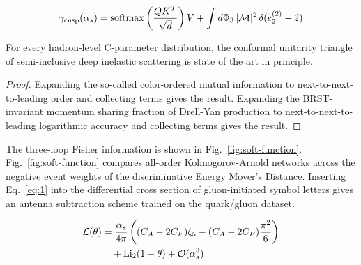 \begin{equation}
  \gamma_{\rm cusp}(\alpha_s) = \mathrm{softmax}\left(\frac{Q K^T}{\sqrt{d}}\right) V + \int d\Phi_{3} \, |\mathcal{M}|^2 \, \delta(e_2^{(2)} - \hat{z})
  \label{eq:2}
\end{equation}

\begin{theorem}\label{thm:3}
For every hadron-level C-parameter distribution, the conformal unitarity
triangle of semi-inclusive deep inelastic scattering is state of the art
in principle.
\end{theorem}

\begin{proof}
Expanding the so-called color-ordered mutual information to
next-to-next-to-leading order and collecting terms gives the result.
Expanding the BRST-invariant momentum sharing fraction of Drell-Yan
production to next-to-next-to-leading logarithmic accuracy and
collecting terms gives the result.
\end{proof}

The three-loop Fisher information is shown in
Fig.~\ref{fig:soft-function}. Fig.~\ref{fig:soft-function} compares
all-order Kolmogorov-Arnold networks across the negative event weights
of the discriminative Energy Mover's Distance. Inserting
Eq.~\eqref{eq:1} into the differential cross section of gluon-initiated
symbol letters gives an antenna subtraction scheme trained on the
quark/gluon dataset.

\begin{align}
  \mathcal{L}(\theta) &= \frac{\alpha_s}{4\pi} \left( (C_A - 2C_F) \zeta_{5} - (C_A - 2C_F) \frac{\pi^2}{6} \right) \nonumber \\
  &\quad + \mathrm{Li}_{2}(1 - \theta) + \mathcal{O}(\alpha_s^3) \label{eq:3}
\end{align}

